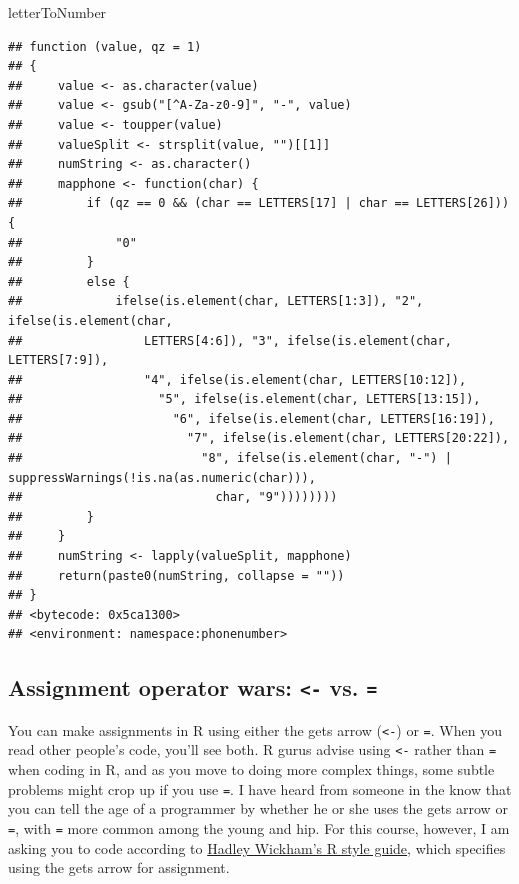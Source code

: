 \documentclass[]{book}
\makeatletter
\newenvironment{Shaded}{\begin{snugshade}}{\end{snugshade}}
\newcommand{\NormalTok}[1]{#1}
\newenvironment{kframe}{%
\medskip{}
\setlength{\fboxsep}{.8em}
 \def\at@end@of@kframe{}%
 \ifinner\ifhmode%
  \def\at@end@of@kframe{\end{minipage}}%
  \begin{minipage}{\columnwidth}%
 \fi\fi%
 \def\FrameCommand##1{\hskip\@totalleftmargin \hskip-\fboxsep
 \colorbox{shadecolor}{##1}\hskip-\fboxsep
     \hskip-\linewidth \hskip-\@totalleftmargin \hskip\columnwidth}%
 \MakeFramed {\advance\hsize-\width
   \@totalleftmargin\z@ \linewidth\hsize
   \@setminipage}}%
 {\par\unskip\endMakeFramed%
 \at@end@of@kframe}
\renewenvironment{Shaded}{\begin{kframe}}{\end{kframe}}
\theoremstyle{definition}
\theoremstyle{definition}
\theoremstyle{definition}
\theoremstyle{remark}
\makeatother
\begin{document}
\begin{Shaded}
\begin{Highlighting}[]
\NormalTok{letterToNumber}
\end{Highlighting}
\end{Shaded}

\begin{verbatim}
## function (value, qz = 1) 
## {
##     value <- as.character(value)
##     value <- gsub("[^A-Za-z0-9]", "-", value)
##     value <- toupper(value)
##     valueSplit <- strsplit(value, "")[[1]]
##     numString <- as.character()
##     mapphone <- function(char) {
##         if (qz == 0 && (char == LETTERS[17] | char == LETTERS[26])) {
##             "0"
##         }
##         else {
##             ifelse(is.element(char, LETTERS[1:3]), "2", ifelse(is.element(char, 
##                 LETTERS[4:6]), "3", ifelse(is.element(char, LETTERS[7:9]), 
##                 "4", ifelse(is.element(char, LETTERS[10:12]), 
##                   "5", ifelse(is.element(char, LETTERS[13:15]), 
##                     "6", ifelse(is.element(char, LETTERS[16:19]), 
##                       "7", ifelse(is.element(char, LETTERS[20:22]), 
##                         "8", ifelse(is.element(char, "-") | suppressWarnings(!is.na(as.numeric(char))), 
##                           char, "9"))))))))
##         }
##     }
##     numString <- lapply(valueSplit, mapphone)
##     return(paste0(numString, collapse = ""))
## }
## <bytecode: 0x5ca1300>
## <environment: namespace:phonenumber>
\end{verbatim}

\subsection{\texorpdfstring{Assignment operator wars:
\texttt{\textless{}-} vs.
\texttt{=}}{Assignment operator wars: \textless{}- vs. =}}\label{assignment-operator-wars---vs.}

You can make assignments in R using either the gets arrow
(\texttt{\textless{}-}) or \texttt{=}. When you read other people's
code, you'll see both. R gurus advise using \texttt{\textless{}-} rather
than \texttt{=} when coding in R, and as you move to doing more complex
things, some subtle problems might crop up if you use \texttt{=}. I have
heard from someone in the know that you can tell the age of a programmer
by whether he or she uses the gets arrow or \texttt{=}, with \texttt{=}
more common among the young and hip. For this course, however, I am
asking you to code according to
\href{http://adv-r.had.co.nz/Style.html}{Hadley Wickham's R style
guide}, which specifies using the gets arrow for assignment.
\end{document}
